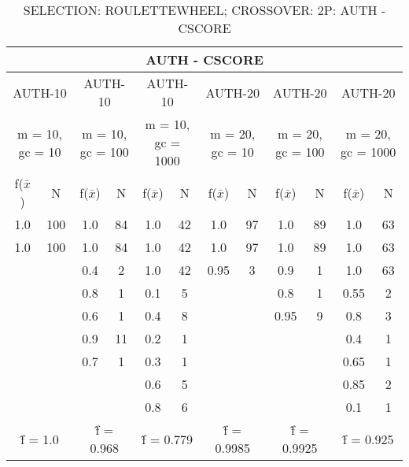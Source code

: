 
\begin{table}[H]
	\centering
	\caption{SELECTION: ROULETTEWHEEL; CROSSOVER: 2P: AUTH - CSCORE}
	\vspace{5mm}
	\begin{adjustbox}{width=1\textwidth}
		\begin{tabular}{ |c|c||c|c||c|c||c|c||c|c||c|c| }
			\hline
			\multicolumn{12}{|c|}{AUTH - CSCORE} \\
			\hline
			\multicolumn{2}{|c||}{AUTH-10} & \multicolumn{2}{c||}{AUTH-10} & \multicolumn{2}{c||}{AUTH-10} & \multicolumn{2}{c||}{AUTH-20} & \multicolumn{2}{c||}{AUTH-20} & \multicolumn{2}{c|}{AUTH-20}\\
			\hline
			\multicolumn{2}{|c||}{m = 10, gc = 10} & \multicolumn{2}{c||}{m = 10, gc = 100} & \multicolumn{2}{c||}{m = 10, gc = 1000} & \multicolumn{2}{c||}{m = 20, gc = 10} & \multicolumn{2}{c||}{m = 20, gc = 100} & \multicolumn{2}{c|}{m = 20, gc = 1000}\\
			\hline
			f($\bar{x}$) & N & f($\bar{x}$) & N & f($\bar{x}$) & N & f($\bar{x}$) & N & f($\bar{x}$) & N & f($\bar{x}$) & N\\
			\hline
			\hline
			1.0 & 100 & 1.0 & 84 & 1.0 & 42 & 1.0 & 97 & 1.0 & 89 & 1.0 & 63\\
			\hline
			1.0 & 100 & 1.0 & 84 & 1.0 & 42 & 1.0 & 97 & 1.0 & 89 & 1.0 & 63\\
			&   & 0.4 & 2 & 1.0 & 42 & 0.95 & 3 & 0.9 & 1 & 1.0 & 63\\
			&   & 0.8 & 1 & 0.1 & 5 &   &   & 0.8 & 1 & 0.55 & 2\\
			&   & 0.6 & 1 & 0.4 & 8 &   &   & 0.95 & 9 & 0.8 & 3\\
			&   & 0.9 & 11 & 0.2 & 1 &   &   &   &   & 0.4 & 1\\
			&   & 0.7 & 1 & 0.3 & 1 &   &   &   &   & 0.65 & 1\\
			&   &   &   & 0.6 & 5 &   &   &   &   & 0.85 & 2\\
			&   &   &   & 0.8 & 6 &   &   &   &   & 0.1 & 1\\
			\hline
			\multicolumn{2}{|c||}{\^{f} = 1.0} & \multicolumn{2}{c||}{\^{f} = 0.968} & \multicolumn{2}{c||}{\^{f} = 0.779} & \multicolumn{2}{c||}{\^{f} = 0.9985} & \multicolumn{2}{c||}{\^{f} = 0.9925} & \multicolumn{2}{c|}{\^{f} = 0.925}\\
			\hline
		\end{tabular}
	\end{adjustbox}
	\label{tab-5p-res1}
\end{table}

